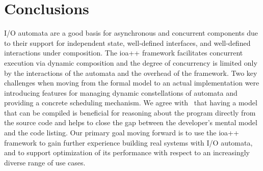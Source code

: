 \section{Conclusions\label{conclusion}}

I/O automata are a good basis for asynchronous and concurrent components due to their support for independent state, well-defined interfaces, and well-defined interactions under composition.
The ioa++ framework facilitates concurrent execution via dynamic composition and the degree of concurrency is limited only by the interactions of the automata and the overhead of the framework.
Two key challenges when moving from the formal model to an actual implementation were introducing features for managing dynamic constellations of automata and providing a concrete scheduling mechanism.
We agree with~\cite{georgiou2009automated} that having a model that can be compiled is beneficial for reasoning about the program directly from the source code and helps to close the gap between the developer's mental model and the code listing.
Our primary goal moving forward is to use the ioa++ framework to gain further experience building real systems with I/O automata, and to support optimization of its performance with respect to an increasingly diverse range of use cases.



